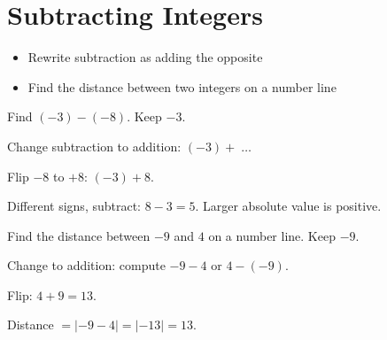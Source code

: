 \section{Subtracting Integers}

\begin{stepGoal}
\begin{itemize}
    \item Rewrite subtraction as adding the opposite
    \item Find the distance between two integers on a number line
\end{itemize}
\end{stepGoal}

\begin{stepVocabBox}
\end{stepVocabBox}

\begin{stepsCard}
\end{stepsCard}

\begin{stepExample}{Find $(-3) - (-8)$.}
     Keep $-3$.

     Change subtraction to addition: $(-3) + \;\ldots$

     Flip $-8$ to $+8$: $(-3) + 8$.

     Different signs, subtract: $8 - 3 = 5$. Larger absolute value is positive.
\end{stepExample}

\begin{stepExample}{Find the distance between $-9$ and $4$ on a number line.}
     Keep $-9$.

     Change to addition: compute $-9 - 4$ or $4 - (-9)$.

     Flip: $4 + 9 = 13$.

     Distance $= |{-9} - 4| = |{-13}| = 13$.
\end{stepExample}

